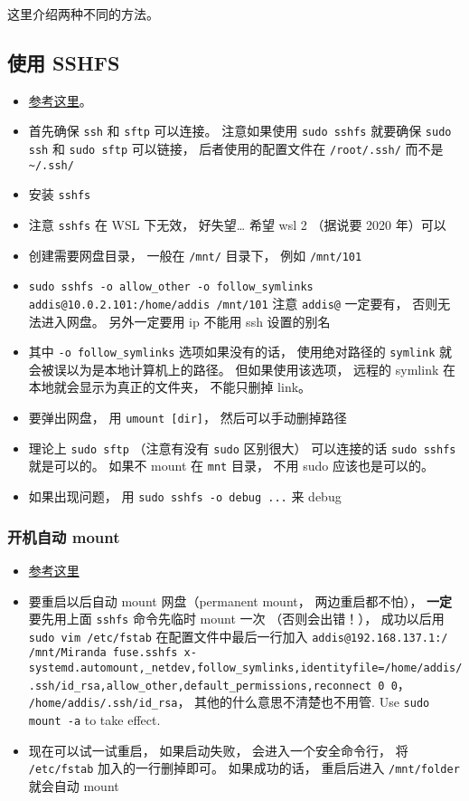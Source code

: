 
这里介绍两种不同的方法。

\subsection{使用 SSHFS}
\begin{itemize}
\item \href{https://www.digitalocean.com/community/tutorials/how-to-use-sshfs-to-mount-remote-file-systems-over-ssh}{参考这里}。
\item 首先确保 \verb`ssh` 和 \verb|sftp| 可以连接。 注意如果使用 \verb|sudo sshfs| 就要确保 \verb|sudo ssh| 和 \verb|sudo sftp| 可以链接， 后者使用的配置文件在 \verb|/root/.ssh/| 而不是 \verb|~/.ssh/|
\item 安装 \verb`sshfs`
\item 注意 \verb`sshfs` 在 WSL 下无效， 好失望… 希望 wsl 2 （据说要 2020 年）可以
\item 创建需要网盘目录， 一般在 \verb`/mnt/` 目录下， 例如 \verb`/mnt/101`
\item \verb`sudo sshfs -o allow_other -o follow_symlinks addis@10.0.2.101:/home/addis /mnt/101` 注意 \verb`addis@` 一定要有， 否则无法进入网盘。 另外一定要用 ip 不能用 ssh 设置的别名
\item 其中 \verb|-o follow_symlinks| 选项如果没有的话， 使用绝对路径的 \verb|symlink| 就会被误以为是本地计算机上的路径。 但如果使用该选项， 远程的 symlink 在本地就会显示为真正的文件夹， 不能只删掉 link。
\item 要弹出网盘， 用 \verb`umount [dir]`， 然后可以手动删掉路径
\item 理论上 \verb|sudo sftp| （注意有没有 \verb|sudo| 区别很大） 可以连接的话 \verb|sudo sshfs| 就是可以的。 如果不 mount 在 \verb|mnt| 目录， 不用 sudo 应该也是可以的。
\item 如果出现问题， 用 \verb|sudo sshfs -o debug ...| 来 debug
\end{itemize}

\subsubsection{开机自动 mount}
\begin{itemize}
\item \href{https://www.linode.com/docs/networking/ssh/using-sshfs-on-linux/}{参考这里}
\item 要重启以后自动 mount 网盘（permanent mount， 两边重启都不怕）， \textbf{一定}要先用上面 \verb`sshfs` 命令先临时 mount 一次 （否则会出错！）， 成功以后用 \verb`sudo vim /etc/fstab` 在配置文件中最后一行加入 \verb`addis@192.168.137.1:/ /mnt/Miranda fuse.sshfs x-systemd.automount,_netdev,follow_symlinks,identityfile=/home/addis/.ssh/id_rsa,allow_other,default_permissions,reconnect 0 0`， \verb`/home/addis/.ssh/id_rsa`， 其他的什么意思不清楚也不用管. Use \verb`sudo mount -a` to take effect.
\item 现在可以试一试重启， 如果启动失败， 会进入一个安全命令行， 将 \verb`/etc/fstab` 加入的一行删掉即可。 如果成功的话， 重启后进入 \verb`/mnt/folder` 就会自动 mount
\end{itemize}

